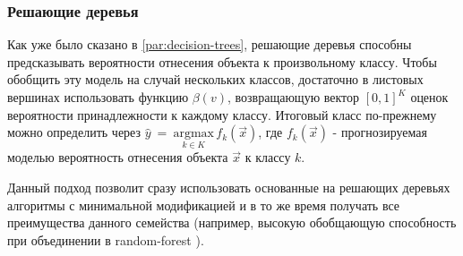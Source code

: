 \subsubsection{Решающие деревья}
Как уже было сказано в \ref{par:decision-trees}, решающие деревья способны предсказывать вероятности отнесения объекта к произвольному классу.
Чтобы обобщить эту модель на случай нескольких классов, достаточно в листовых вершинах использовать функцию $\beta (v)$, возвращающую вектор $[0, 1]^K$ оценок вероятности принадлежности к каждому классу.
Итоговый класс по-прежнему можно определить через $\hat{y}~=~\underset{k \in K}{\mathrm{argmax}}\, f_k (\vec{x})$, где $f_k (\vec{x})$ - прогнозируемая моделью вероятность отнесения объекта $\vec{x} $ к классу $k$.

Данный подход позволит сразу использовать основанные на решающих деревьях алгоритмы с минимальной модификацией и в то же время получать все преимущества данного семейства (например, высокую обобщающую способность при объединении в \gls{random-forest} \cite{cite:random-forest}).
